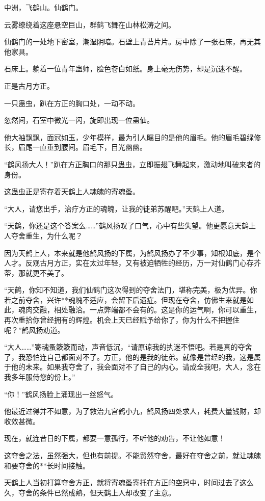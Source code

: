 \begin{this_body}
中洲，飞鹤山。仙鹤门。

云雾缭绕着这座悬空巨山，群鹤飞舞在山林松涛之间。

仙鹤门的一处地下密室，潮湿阴暗。石壁上青苔片片。房中除了一张石床，再无其他家具。

石床上。躺着一位青年蛊师，脸色苍白如纸。身上毫无伤势，却是沉迷不醒。

正是古月方正。

一只蛊虫，趴在方正的胸口处，一动不动。

忽然间，石室中微光一闪，旋即出现一位蛊仙。

他大袖飘飘，面冠如玉，少年模样，最为引人瞩目的是他的眉毛。他的眉毛碧绿修长，眉尾一直垂到腰间。眉毛下，目光幽幽。

“鹤风扬大人！”趴在方正胸口的那只蛊虫，立即振翅飞舞起来，激动地叫破来者的身份。

这蛊虫正是寄存着天鹤上人魂魄的寄魂蚤。

“大人，请您出手，治疗方正的魂魄，让我的徒弟苏醒吧。”天鹤上人道。

“天鹤，你还是这个答案么……”鹤风扬叹了口气，心中有些失望。他更愿意天鹤上人夺舍重生，为什么呢？

因为天鹤上人，本来就是他鹤风扬的下属，为鹤风扬办了不少事，知根知底，是个人才。反观古月方正，实在太过年轻，又有被迫牺牲的经历，万一对仙鹤门心存芥蒂，那就更不美了。

“天鹤，你知不知道，我们仙鹤门这次得到的夺舍法门，堪称完美，极为优异。你若之前夺舍，兴许**魂魄不适应，会留下后遗症。但现在夺舍，仿佛生来就是如此，魂肉交融，相处融洽。一点弊端都不会有的。这是你的运气啊，你可以重生，再次重拾你曾经拥有的辉煌。机会上天已经赋予给你了，你为什么不把握住呢？”鹤风扬劝道。

“大人……”寄魂蚤簌簌而动，声音低沉，“请原谅我的执迷不悟吧。若是真的夺舍了，我恐怕连自己都面对不了。方正，他的是我的徒弟。就像是曾经的我，这是属于他的未来。如果我夺舍了，我会面对不了自己的内心。请成全我吧，大人，念在我多年服侍您的份上。”

“你！”鹤风扬脸上涌现出一丝怒气。

他最近过得并不如意，为了救治九宫鹤小九，鹤风扬四处求人，耗费大量钱财，却收效甚微。

现在，就连昔日的下属，都要一意孤行，不听他的劝告，不让他如意！

这夺舍之法，虽然强大，但也有前提。不能贸然夺舍，最好在夺舍之前，就让魂魄和要夺舍的**长时间接触。

天鹤上人当初打算夺舍方正，就将寄魂蚤寄托在方正的空窍中，时间过去了这么久，夺舍的条件已然成熟，但天鹤上人却改变了主意。


\end{this_body}
